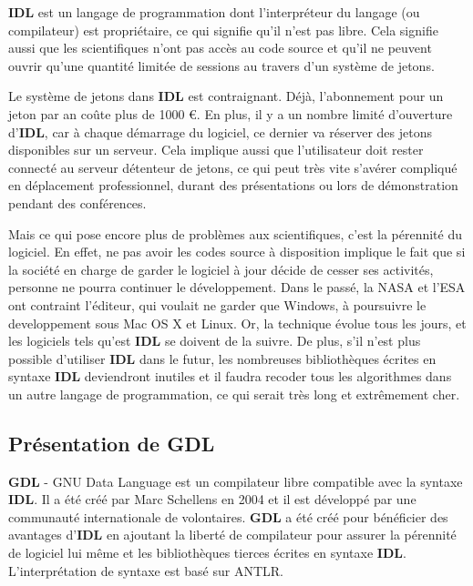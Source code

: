 \textbf{IDL} est un langage de programmation dont l’interpréteur du langage (ou compilateur) est propriétaire, ce qui signifie qu’il n’est pas libre. Cela signifie aussi que les scientifiques n’ont pas accès au code source et qu’il ne peuvent ouvrir qu’une quantité limitée de sessions au travers d’un système de jetons.

Le système de jetons dans \textbf{IDL} est contraignant. Déjà, l'abonnement pour un jeton par an coûte plus de 1000 \euro. En plus, il y a un nombre limité d’ouverture d’\textbf{IDL}, car à chaque démarrage du logiciel, ce dernier va réserver des jetons disponibles sur un serveur. Cela implique aussi que l’utilisateur doit rester connecté au serveur détenteur de jetons, ce qui peut très vite s’avérer compliqué en déplacement professionnel, durant des présentations ou lors de démonstration pendant des conférences.

Mais ce qui pose encore plus de problèmes aux scientifiques, c’est la pérennité du logiciel. En effet, ne pas avoir les codes source à disposition implique le fait que si la société en charge de garder le logiciel à jour décide de cesser ses activités, personne ne pourra continuer le développement. Dans le passé, la NASA et l'ESA ont contraint l’éditeur, qui voulait ne garder que Windows, à poursuivre le developpement sous Mac OS X et Linux. Or, la technique évolue tous les jours, et les logiciels tels qu'est \textbf{IDL} se doivent de la suivre. De plus, s’il n’est plus possible d’utiliser \textbf{IDL} dans le futur, les nombreuses bibliothèques écrites en syntaxe \textbf{IDL} deviendront inutiles et il faudra recoder tous les algorithmes dans un autre langage de programmation, ce qui serait très long et extrêmement cher. %

\subsection{Présentation de GDL}

\textbf{GDL} - GNU Data Language est un compilateur libre compatible avec la syntaxe \textbf{IDL}. Il a été créé par Marc Schellens en 2004 et il est développé par une communauté internationale de volontaires. \textbf{GDL} a été créé pour bénéficier des avantages d'\textbf{IDL} en ajoutant la liberté de compilateur pour assurer la pérennité de logiciel lui même et les bibliothèques tierces écrites en syntaxe \textbf{IDL}. L’interprétation de syntaxe est basé sur ANTLR.

